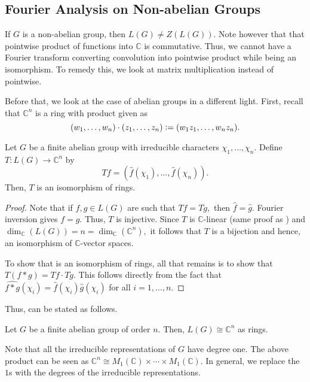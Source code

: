 \documentclass[12pt]{article}	%
\begin{document}
\subsection{Fourier Analysis on Non-abelian Groups}

If $G$ is a non-abelian group, then $L(G) \neq Z(L(G)).$ Note however that that pointwise product of functions into $\mathbb{C}$ is commutative. Thus, we cannot have a Fourier transform converting convolution into pointwise product while being an isomorphism. To remedy this, we look at matrix multiplication instead of pointwise.

Before that, we look at the case of abelian groups in a different light. First, recall that $\mathbb{C}^n$ is a ring with product given as
\begin{equation*} 
    (w_1, \ldots, w_n) \cdot (z_1, \ldots, z_n) \vcentcolon= (w_1z_1, \ldots, w_nz_n).
\end{equation*}

\begin{prop}
    Let $G$ be a finite abelian group with irreducible characters $\chi_1, \ldots, \chi_n.$ Define $T : L(G) \to \mathbb{C}^n$ by
    \begin{equation*} 
        Tf = (\widehat{f}(\chi_1), \ldots, \widehat{f}(\chi_n)).
    \end{equation*}
    Then, $T$ is an isomorphism of rings.
\end{prop}
\begin{proof} 
    Note that if $f, g \in L(G)$ are such that $Tf = Tg,$ then $\widehat{f} = \widehat{g}.$ Fourier inversion gives $f = g.$ Thus, $T$ is injective. Since $T$ is $\mathbb{C}$-linear (same proof as ) and $\dim_{\mathbb{C}}(L(G)) = n = \dim_{\mathbb{C}}(\mathbb{C}^n),$ it follows that $T$ is a bijection and hence, an isomorphism of $\mathbb{C}$-vector spaces.

    To show that is an isomorphism of rings, all that remains is to show that $T(f * g) = Tf \cdot Tg.$ This follows directly from the fact that $\widehat{f * g}(\chi_i) = \widehat{f}(\chi_i)\widehat{g}(\chi_i)$ for all $i = 1, \ldots, n.$
\end{proof}

Thus,  can be stated as follows.
\begin{thm}
    Let $G$ be a finite abelian group of order $n.$ Then, $L(G) \cong \mathbb{C}^n$ as rings.
\end{thm}

Note that all the irreducible representations of $G$ have degree one. The above product can be seen as $\mathbb{C}^n \cong M_1(\mathbb{C}) \times \cdots \times M_1(\mathbb{C}).$ In general, we replace the $1$s with the degrees of the irreducible representations.
\end{document}
